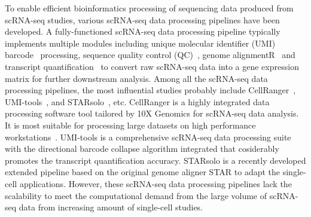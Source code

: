 \documentclass[conference]{IEEEtran}
\begin{document}
To enable efficient bioinformatics processing of sequencing data produced from scRNA-seq studies, various scRNA-seq data processing pipelines have been developed.
A fully-functioned scRNA-seq data processing pipeline typically implements multiple modules including unique molecular identifier (UMI) barcode~\cite{Smith2017UMItools} processing, sequence quality control (QC)~\cite{schmieder2011quality}, genome alignmentR~\cite{Dobin2013STAR,Kim2015HISAT} and transcript quantification~\cite{Parekh2018zUMIs} to convert raw scRNA-seq data into a gene expression matrix for further downstream analysis. 
Among all the scRNA-seq data processing pipelines, the most influential studies probably include CellRanger~\cite{Zheng2017Massively}, UMI-tools~\cite{Smith2017UMItools}, and STARsolo~\cite{Blibaum2019STARsolo}, etc. 
CellRanger is a highly integrated data processing software tool tailored by 10X Genomics for scRNA-seq data analysis. It is most suitable for processing large datasets on high performance workstations~\cite{Gao2020Comparison}. 
UMI-tools is a comprehensive scRNA-seq data processing suite with the directional barcode collapse algorithm integrated that cosiderably promotes the transcript quantification accuracy.
STARsolo is a recently developed extended pipeline based on the original genome aligner STAR to adapt the single-cell applications. 
However, these scRNA-seq data processing pipelines lack the scalability to meet the computational demand from the large volume of scRNA-seq data from increasing amount of single-cell studies. 

\end{document}
